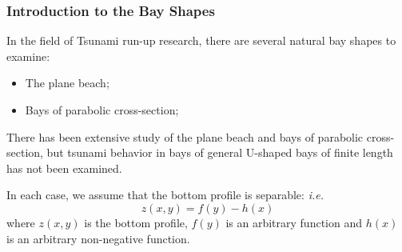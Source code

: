 
	\begin{frame}
		\frametitle{Introduction to the Bay Shapes}
		In the field of Tsunami run-up research, there are several natural bay shapes to examine:
		\begin{itemize}
			\item The plane beach;
			\item Bays of parabolic cross-section;
		\end{itemize}
		There has been extensive study of the plane beach and bays of parabolic cross-section, but tsunami behavior in bays of general U-shaped bays of finite length has not been examined.
		
		In each case, we assume that the bottom profile is separable: \emph{i.e.}
		\[   z(x,y) = f(y) - h(x)  \]
		where $z(x,y)$ is the bottom profile, $f(y)$ is an arbitrary function and $h(x)$ is an arbitrary non-negative function.
	\end{frame}



